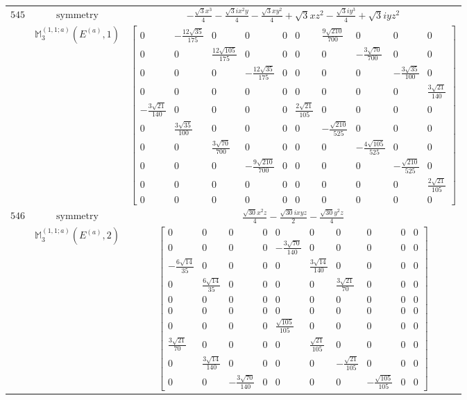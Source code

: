 \documentclass[fleqn,8pt,landscape]{jsarticle}
\begin{document}
\begin{longtable}{ccc}
$ 545 $ & $ \text{symmetry} $ & $ - \frac{\sqrt{3} x^{3}}{4} - \frac{\sqrt{3} i x^{2} y}{4} - \frac{\sqrt{3} x y^{2}}{4} + \sqrt{3} x z^{2} - \frac{\sqrt{3} i y^{3}}{4} + \sqrt{3} i y z^{2} $ \\
$  $ & $ \mathbb{M}_{3}^{(1,1;a)}(E^{(a)},1) $ & $ \begin{bmatrix} 0 & - \frac{12 \sqrt{35}}{175} & 0 & 0 & 0 & 0 & \frac{9 \sqrt{210}}{700} & 0 & 0 & 0 \\ 0 & 0 & \frac{12 \sqrt{105}}{175} & 0 & 0 & 0 & 0 & - \frac{3 \sqrt{70}}{700} & 0 & 0 \\ 0 & 0 & 0 & - \frac{12 \sqrt{35}}{175} & 0 & 0 & 0 & 0 & - \frac{3 \sqrt{35}}{100} & 0 \\ 0 & 0 & 0 & 0 & 0 & 0 & 0 & 0 & 0 & \frac{3 \sqrt{21}}{140} \\ - \frac{3 \sqrt{21}}{140} & 0 & 0 & 0 & 0 & \frac{2 \sqrt{21}}{105} & 0 & 0 & 0 & 0 \\ 0 & \frac{3 \sqrt{35}}{100} & 0 & 0 & 0 & 0 & - \frac{\sqrt{210}}{525} & 0 & 0 & 0 \\ 0 & 0 & \frac{3 \sqrt{70}}{700} & 0 & 0 & 0 & 0 & - \frac{4 \sqrt{105}}{525} & 0 & 0 \\ 0 & 0 & 0 & - \frac{9 \sqrt{210}}{700} & 0 & 0 & 0 & 0 & - \frac{\sqrt{210}}{525} & 0 \\ 0 & 0 & 0 & 0 & 0 & 0 & 0 & 0 & 0 & \frac{2 \sqrt{21}}{105} \\ 0 & 0 & 0 & 0 & 0 & 0 & 0 & 0 & 0 & 0 \end{bmatrix} $ \\ \hline
$ 546 $ & $ \text{symmetry} $ & $ \frac{\sqrt{30} x^{2} z}{4} - \frac{\sqrt{30} i x y z}{2} - \frac{\sqrt{30} y^{2} z}{4} $ \\
$  $ & $ \mathbb{M}_{3}^{(1,1;a)}(E^{(a)},2) $ & $ \begin{bmatrix} 0 & 0 & 0 & 0 & 0 & 0 & 0 & 0 & 0 & 0 \\ 0 & 0 & 0 & 0 & - \frac{3 \sqrt{70}}{140} & 0 & 0 & 0 & 0 & 0 \\ - \frac{6 \sqrt{14}}{35} & 0 & 0 & 0 & 0 & \frac{3 \sqrt{14}}{140} & 0 & 0 & 0 & 0 \\ 0 & \frac{6 \sqrt{14}}{35} & 0 & 0 & 0 & 0 & \frac{3 \sqrt{21}}{70} & 0 & 0 & 0 \\ 0 & 0 & 0 & 0 & 0 & 0 & 0 & 0 & 0 & 0 \\ 0 & 0 & 0 & 0 & 0 & 0 & 0 & 0 & 0 & 0 \\ 0 & 0 & 0 & 0 & \frac{\sqrt{105}}{105} & 0 & 0 & 0 & 0 & 0 \\ \frac{3 \sqrt{21}}{70} & 0 & 0 & 0 & 0 & \frac{\sqrt{21}}{105} & 0 & 0 & 0 & 0 \\ 0 & \frac{3 \sqrt{14}}{140} & 0 & 0 & 0 & 0 & - \frac{\sqrt{21}}{105} & 0 & 0 & 0 \\ 0 & 0 & - \frac{3 \sqrt{70}}{140} & 0 & 0 & 0 & 0 & - \frac{\sqrt{105}}{105} & 0 & 0 \end{bmatrix} $ \\ \hline

\end{longtable}
\end{document}
